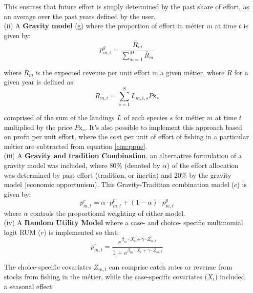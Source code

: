 \documentclass[12pt, halfline, a4paper]{ouparticle}
\begin{document}
This ensures that future effort is simply determined by the past share of
effort, as an average over the past years defined by the user. \\

(ii) A \textbf{Gravity model} (g) where the proportion of effort in métier $m$ at
time $t$ is given by: 
\begin{equation}
p^{g}_{m,t} = \frac{\overline{R}_{m}}{\sum\limits_{m=1}^{M}\overline{R}_{m}} 
\end{equation}

where $\overline{R}_m$ is the expected revenue per unit effort in a given
métier, where $R$ for a given year is defined as: 
\begin{equation}
R_{m,t} =  \sum\limits_{s=1}^{S} L_{m,t,s} P\text{x}_{s} 
\label{eqn:ppue}
\end{equation}

comprised of the sum of the landings $L$ of each species $s$ for métier $m$ at
time $t$ multiplied by the price $P\text{x}_{s}$. It's also possible to
implement this approach based on profit per unit effort, where the cost per
unit of effort of fishing in a particular métier are subtracted from equation
\ref{eqn:ppue}. \\

(iii) A \textbf{Gravity and tradition Combination}, an alternative formulation
of a gravity model was included, where 80\% (denoted by $\alpha$) of the effort
allocation was determined by past effort (tradition, or inertia) and 20\% by
the gravity model (economic opportunism). This Gravity-Tradition combination
model ($c$) is given by:
\begin{equation}
	p^{c}_{m,t} = \alpha \cdot p^{p}_{m,t} + (1 - \alpha) \cdot p^{g}_{m,t}
\end{equation}
where $\alpha$ controls the proportional weighting of either model. \\ 

(iv) A \textbf{Random Utility Model} where a case- and choice- specific
multinomial logit RUM ($r$) is implemented so that:  
\begin{equation}
p^{r}_{m,t} = \frac{e^{\beta_{m} \cdot X_{t} + \gamma \cdot Z_{m,t}}}{1 + 
	e^{\beta_{m} \cdot X_{t} + \gamma \cdot Z_{m,t}}}
\label{eqn:rum}
\end{equation} 

The choice-specific covariates $Z_{m,t}$ can comprise catch rates or revenue
from stocks from fishing in the métier, while the case-specific covariates
($X_{t}$) included a seasonal effect. \\
\end{document}
